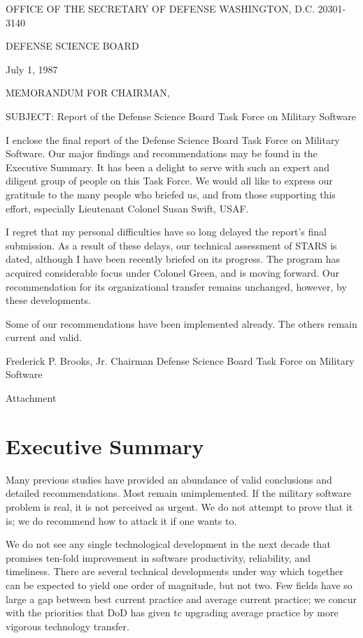 \documentclass[12pt]{article}
\begin{document}
OFFICE OF THE SECRETARY OF DEFENSE
WASHINGTON, D.C. 20301-3140

DEFENSE SCIENCE BOARD

July 1, 1987

MEMORANDUM FOR CHAIRMAN,

SUBJECT: Report of the Defense Science Board Task Force on Military Software

I enclose the final report of the Defense Science Board Task Force on Military
Software.  Our major findings and recommendations may be found in the
Executive Summary.  It has been a delight to serve with such an expert and
diligent group of people on this Task Force. We would all like to express our
gratitude to the many people who briefed us, and from those supporting this
effort, especially Lieutenant Colonel Susan Swift, USAF.

I regret that my personal difficulties have so long delayed the report's final
submission.  As a result of these delays, our technical assessment of STARS is
dated, although I have been recently briefed on its progress.  The program has
acquired considerable focus under Colonel Green, and is moving forward.  Our
recommendation for its organizational transfer remains unchanged, however, by
these developments.

Some of our recommendations have been implemented already.  The others remain
current and valid.

Frederick P. Brooks, Jr.
Chairman
Defense Science Board
Task Force on Military Software

Attachment

\newpage


\maketitle

\section{Executive Summary}

Many previous studies have provided an abundance of valid conclusions and
detailed recommendations. Most remain unimplemented. If the military software
problem is real, it is not perceived as urgent. We do not attempt to prove
that it is; we do recommend how to attack it if one wants to.

We do not see any single technological development in the next decade that
promises ten-fold improvement in software productivity, reliability, and
timeliness. There are several technical developments under way which together
can be expected to yield one order of magnitude, but not two. Few fields have
so large a gap between best current practice and average current practice; we
concur with the priorities that DoD has given tc upgrading average practice by
more vigorous technology transfer.
\end{document}
